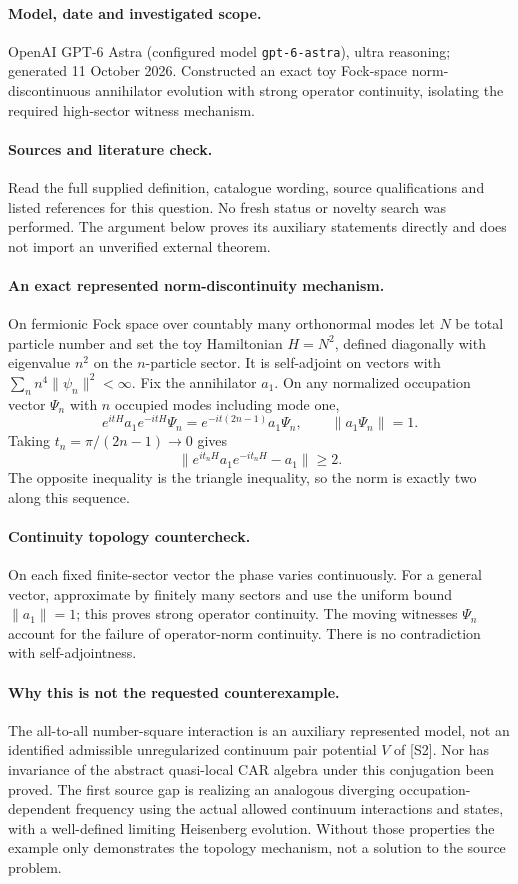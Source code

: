 \documentclass[11pt]{article}
\begin{document}
\paragraph{Model, date and investigated scope.}
OpenAI GPT-6 Astra (configured model \texttt{gpt-6-astra}), ultra reasoning; generated 11 October 2026. Constructed an exact toy Fock-space norm-discontinuous annihilator evolution with strong operator continuity, isolating the required high-sector witness mechanism.

\paragraph{Sources and literature check.}
Read the full supplied definition, catalogue wording, source qualifications and listed references for this question. No fresh status or novelty search was performed. The argument below proves its auxiliary statements directly and does not import an unverified external theorem.

\paragraph{An exact represented norm-discontinuity mechanism.} On fermionic Fock space over countably many orthonormal modes let \(N\) be total particle number and set the toy Hamiltonian \(H=N^2\), defined diagonally with eigenvalue \(n^2\) on the \(n\)-particle sector. It is self-adjoint on vectors with \(\sum_n n^4\|\psi_n\|^2<\infty\). Fix the annihilator \(a_1\). On any normalized occupation vector \(\Psi_n\) with \(n\) occupied modes including mode one,
\[
 e^{itH}a_1e^{-itH}\Psi_n
 =e^{-it(2n-1)}a_1\Psi_n,
 \qquad\|a_1\Psi_n\|=1.
\]
Taking \(t_n=\pi/(2n-1)\to0\) gives
\[
 \|e^{it_nH}a_1e^{-it_nH}-a_1\|\geq2.
\]
The opposite inequality is the triangle inequality, so the norm is exactly two along this sequence.
\paragraph{Continuity topology countercheck.} On each fixed finite-sector vector the phase varies continuously. For a general vector, approximate by finitely many sectors and use the uniform bound \(\|a_1\|=1\); this proves strong operator continuity. The moving witnesses \(\Psi_n\) account for the failure of operator-norm continuity. There is no contradiction with self-adjointness.
\paragraph{Why this is not the requested counterexample.} The all-to-all number-square interaction is an auxiliary represented model, not an identified admissible unregularized continuum pair potential \(V\) of [S2]. Nor has invariance of the abstract quasi-local CAR algebra under this conjugation been proved. The first source gap is realizing an analogous diverging occupation-dependent frequency using the actual allowed continuum interactions and states, with a well-defined limiting Heisenberg evolution. Without those properties the example only demonstrates the topology mechanism, not a solution to the source problem.
\end{document}
